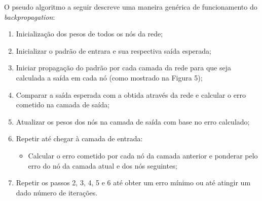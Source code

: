 O pseudo algoritmo a seguir descreve uma maneira genérica de funcionamento do \textit{backpropagation}:

\begin{enumerate}[noitemsep]
    \item Inicialização dos pesos de todos os nós da rede;
    \item Inicializar o padrão de entrara e sua respectiva saída esperada;
    \item Iniciar propagação do padrão por cada camada da rede para que seja calculada a saída em cada nó (como mostrado na Figura 5);
    \item Comparar a saída esperada com a obtida através da rede e calcular o erro cometido na camada de saída;
    \item Atualizar os pesos dos nós na camada de saída com base no erro calculado;
    \item Repetir até chegar à camada de entrada:
        \begin{itemize}[noitemsep]
            \item Calcular o erro cometido por cada nó da camada anterior e ponderar pelo erro do nó da camada atual e dos nós seguintes;
        \end{itemize}
    \item Repetir os passos 2, 3, 4, 5 e 6 até obter um erro mínimo ou até atingir um dado número de iterações.
\end{enumerate}

